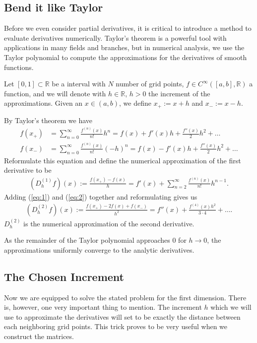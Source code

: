 \subsection{Bend it like Taylor}

Before we even consider partial derivatives, it is critical to introduce a method to evaluate derivatives numerically. Taylor's theorem is a powerful tool with applications in many fields and branches, but in numerical analysis, we use the Taylor polynomial to compute the approximations for the derivatives of smooth functions.

Let \([0, 1] \subset \mathbb{R}\) be a interval with \(N\) number of grid points, \(f \in C^{\infty}([a, b], \mathbb{R})\) a function, and we will denote with \(h \in \mathbb{R}\), \(h > 0\) the increment of the approximations. Given an \(x \in (a, b)\), we define \(x_{+} := x + h\) and \(x_{-} := x - h\).

By Taylor's theorem \cite{H.Amann} we have
\begin{align}
    f(x_{+}) &= \sum^{\infty}_{n = 0} \frac{f^{(n)}(x)}{n!} h^n = f(x) + f'(x)h + \frac{f''(x)}{2}h^2 + \dots \label{eq:1}\\
    f(x_{-}) &= \sum^{\infty}_{n = 0} \frac{f^{(n)}(x)}{n!} (-h)^n = f(x) - f'(x)h + \frac{f''(x)}{2}h^2 + \dots \label{eq:2}
\end{align}
Reformulate this equation and define the numerical approximation of the first derivative to be
\begin{align*}
    (D^{(1)}_h f) (x) := \frac{f(x_{+}) - f(x)}{h} = f'(x) + \sum^{\infty}_{n = 2} \frac{f^{(n)} (x)}{n!}h^{n-1} \text{.}
\end{align*}
Adding (\ref{eq:1}) and (\ref{eq:2}) together and reformulating gives us
\begin{align*}
    (D^{(2)}_h f)(x) := \frac{f(x_{+}) - 2f(x) + f(x_{-})}{h^2} = f''(x) + \frac{f^{(4)}(x)h^2}{3 \cdot 4} + \dots \text{.}
\end{align*}
\(D^{(2)}_h\) is the numerical approximation of the second derivative.

As the remainder of the Taylor polynomial approaches \(0\) for \(h \rightarrow 0\), the approximations uniformly converge to the analytic derivatives.

\subsection{The Chosen Increment}

Now we are equipped to solve the stated problem for the first dimension. There is, however, one very important thing to mention. The increment \(h\) which we will use to approximate the derivatives will set to be exactly the distance between each neighboring grid points. This trick proves to be very useful when we construct the matrices.